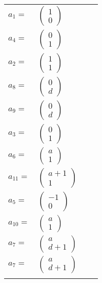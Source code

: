 \documentclass[1p]{elsarticle_modified}
\theoremstyle{definition}
\begin{document}
\begin{tabular}{m{7pt} m{180pt} m{7pt} m{180pt} }
\flushright $a_{1}=$&$\begin{pmatrix}1\\0\end{pmatrix}$ \\
\flushright $a_{4}=$&$\begin{pmatrix}0\\1\end{pmatrix}$ \\
\flushright $a_{2}=$&$\begin{pmatrix}1\\1\end{pmatrix}$ \\
\flushright $a_{8}=$&$\begin{pmatrix}0\\d\end{pmatrix}$ \\
\flushright $a_{9}=$&$\begin{pmatrix}0\\d\end{pmatrix}$ \\
\flushright $a_{3}=$&$\begin{pmatrix}0\\1\end{pmatrix}$ \\
\flushright $a_{6}=$&$\begin{pmatrix}a\\1\end{pmatrix}$ \\
\flushright $a_{11}=$&$\begin{pmatrix}a+1\\1\end{pmatrix}$ \\
\flushright $a_{5}=$&$\begin{pmatrix}-1\\0\end{pmatrix}$ \\
\flushright $a_{10}=$&$\begin{pmatrix}a\\1\end{pmatrix}$ \\
\flushright $a_{7}=$&$\begin{pmatrix}a\\d+1\end{pmatrix}$\\ \flushright $a_{7}=$&$\begin{pmatrix}a\\d+1\end{pmatrix}$\\&\end{tabular}
\end{document}

